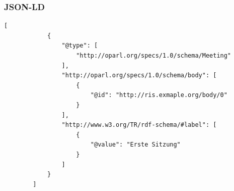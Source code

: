 \documentclass{beamer}
\begin{document}
\begin{frame}[fragile]
    \frametitle{JSON-LD}
    \begin{lstlisting}[basicstyle=\footnotesize\tt, xleftmargin=-32pt]
        [
            {
                "@type": [
                    "http://oparl.org/specs/1.0/schema/Meeting"
                ],
                "http://oparl.org/specs/1.0/schema/body": [
                    {
                        "@id": "http://ris.exmaple.org/body/0"
                    }
                ],
                "http://www.w3.org/TR/rdf-schema/#label": [
                    {
                        "@value": "Erste Sitzung"
                    }
                ]
            }
        ]
    \end{lstlisting}
\end{frame}
\end{document}

